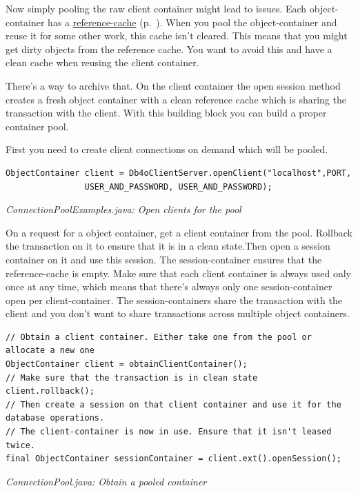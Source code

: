 Now simply pooling the raw client container might lead to issues. Each object-container has a \hyperref[ref:basics-indentity-concept-reference-cache]{reference-cache} (p.~\pageref{ref:basics-indentity-concept-reference-cache}). When you pool the object-container and reuse it for some other work, this cache isn't cleared. This means that you might get dirty objects from the reference cache. You want to avoid this and have a clean cache when reusing the client container.

There's a way to archive that. On the client container the open session method creates a fresh object container with a clean reference cache which is sharing the transaction with the client. With this building block you can build a proper container pool.

First you need to create client connections on demand which will be pooled.

\begin{lstlisting}
ObjectContainer client = Db4oClientServer.openClient("localhost",PORT,
                USER_AND_PASSWORD, USER_AND_PASSWORD);
\end{lstlisting}

{\small\itshape ConnectionPoolExamples.java: Open clients for the pool\par}
\medskip

On a request for a object container, get a client container from the pool. Rollback the transaction on it to ensure that it is in a clean state.Then open a session container on it and use this session. The session-container ensures that the reference-cache is empty. Make sure that each client container is always used only once at any time, which means that there's always only one session-container open per client-container. The session-containers share the transaction with the client and you don't want to share transactions across multiple object containers.

\begin{lstlisting}
// Obtain a client container. Either take one from the pool or allocate a new one
ObjectContainer client = obtainClientContainer();
// Make sure that the transaction is in clean state
client.rollback();
// Then create a session on that client container and use it for the database operations.
// The client-container is now in use. Ensure that it isn't leased twice.
final ObjectContainer sessionContainer = client.ext().openSession();
\end{lstlisting}

{\small\itshape ConnectionPool.java: Obtain a pooled container\par}
\medskip

